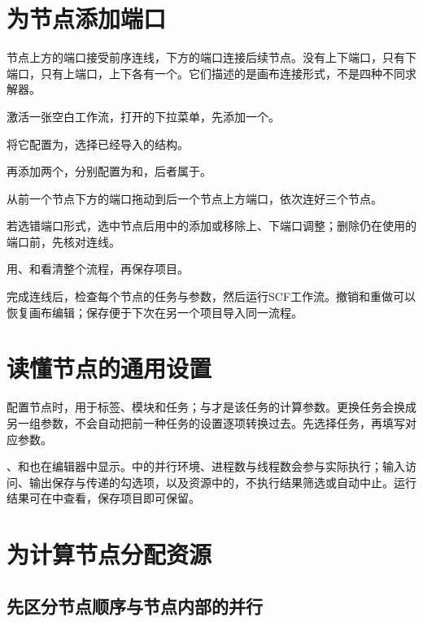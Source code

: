 \section{为节点添加端口}

节点上方的端口接受前序连线，下方的端口连接后续节点。没有上下端口，只有下端口，只有上端口，上下各有一个。它们描述的是画布连接形式，不是四种不同求解器。

\begin{steps}
\item 激活一张空白工作流，打开的下拉菜单，先添加一个。
\item 将它配置为，选择已经导入的结构。
\item 再添加两个，分别配置为和，后者属于。
\item 从前一个节点下方的端口拖动到后一个节点上方端口，依次连好三个节点。
\item 若选错端口形式，选中节点后用中的添加或移除上、下端口调整；删除仍在使用的端口前，先核对连线。
\item 用、和看清整个流程，再保存项目。
\end{steps}

完成连线后，检查每个节点的任务与参数，然后运行SCF工作流。撤销和重做可以恢复画布编辑；保存便于下次在另一个项目导入同一流程。

\section{读懂节点的通用设置}

配置节点时，用于标签、模块和任务；与才是该任务的计算参数。更换任务会换成另一组参数，不会自动把前一种任务的设置逐项转换过去。先选择任务，再填写对应参数。

、和也在编辑器中显示。中的并行环境、进程数与线程数会参与实际执行；输入访问、输出保存与传递的勾选项，以及资源中的，不执行结果筛选或自动中止。运行结果可在中查看，保存项目即可保留。

\section{为计算节点分配资源}\label{sec:node-resources}

\subsection{先区分节点顺序与节点内部的并行}

